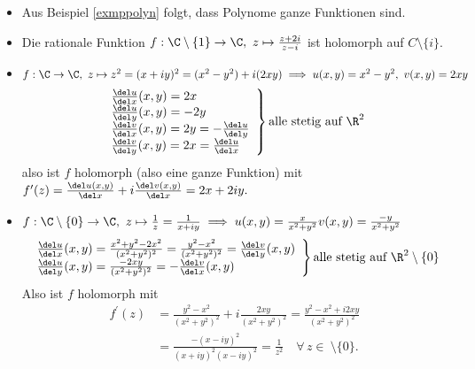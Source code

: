 		\begin{exmp}
			\begin{itemize}
				\item Aus Beispiel \ref{exmppolyn} folgt, dass Polynome ganze Funktionen sind.				
				\item Die rationale Funktion $ f: \C\setminus \{1\} \to \C,\ z \mapsto \frac{z+2i}{z-i} $ ist holomorph auf $ C \setminus \{i\} $.
				\item $ f: \C \to \C,\ z \mapsto z^2 = (x+iy)^2 = (x^2-y^2)+i(2xy) \\
				\implies u(x,y) = x^2-y^2,\ v(x,y) = 2xy $
				\[
				\left.\begin{array}{ll}
					\frac{\del u}{\del x}(x,y) = 2x\\
					\frac{\del u}{\del y}(x,y) = -2y\\
					\frac{\del v}{\del x}(x,y) = 2y = -\frac{\del u}{\del y}\\
					\frac{\del v}{\del y}(x,y) = 2x = \frac{\del u}{\del x}
				\end{array} \right\} \text{alle stetig auf }\R^2
				\]
				also ist $f$ holomorph (also eine ganze Funktion) mit $ f^\prime(z) = \frac{\del u(x,y)}{\del x} + i\frac{\del v(x,y)}{\del x} = 2x + 2iy. $				
				\item $ f: \C\setminus\{0\} \to \C,\ z \mapsto \frac{1}{z} = \frac{1}{x+iy} \implies u(x,y) = \frac{x}{x^2 + y^2} v(x,y) = \frac{-y}{x^2 + y^2} $
				\[
				\left.\begin{array}{ll}
				\frac{\del u}{\del x}(x,y) = \frac{x^2+y^2-2x^2}{(x^2+y^2)^2} = \frac{y^2-x^2}{(x^2+y^2)^2} = \frac{\del v}{\del y}(x,y)\\
				\frac{\del u}{\del y}(x,y) = \frac{-2xy}{(x^2+y^2)^2} = -\frac{\del v}{\del x}(x,y)
				\end{array} \right\} \text{alle stetig auf }\R^2\setminus\{0\}
				\]
				Also ist $f$ holomorph mit 
				\begin{align*}
					f^\prime(z) &= \frac{y^2-x^2}{(x^2+y^2)^2} + i\frac{2xy}{(x^2+y^2)^2} = \frac{y^2-x^2 + i2xy}{(x^2+y^2)^2}\\
					&= \frac{-(x-iy)^2}{(x+iy)^2(x-iy)^2} = \frac{1}{z^2}\quad \forall\, z \in \ \setminus\{0\}. 
				\end{align*}
			\end{itemize}
		\end{exmp}